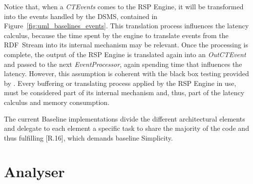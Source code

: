 Notice that, when a \textit{CTEvents} comes to the RSP Engine, it will be transformed into the events handled by the DSMS, contained in Figure~\ref{fig:uml_baselines_events}. This translation process influences the latency calculus, because the time spent by the engine to translate events from the RDF~Stream into its internal mechanism may be relevant. Once the processing is complete, the output of the RSP Engine is translated again into an \textit{OutCTEvent} and passed to the next \textit{EventProcessor}, again spending time that influences the latency. However, this assumption is coherent with the black box testing provided by \namens. Every buffering or translating process applied by the RSP Engine in use, must be considered part of its internal mechanism and, thus, part of the latency calculus and memory consumption.

The current Baseline implementations divide the different architectural elements and delegate to each element a specific task to share the majority of the code and thus fulfilling [R.16], which demands baseline Simplicity.

%

\pagebreak

\section{Analyser}\label{sec:analyser-impl}

